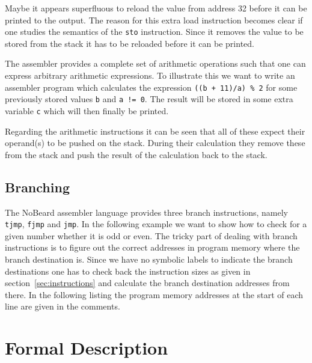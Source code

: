 \documentclass[11pt]{report}
\newcommand{\leongage}{NoBeard}
\begin{document}


Maybe it appears superfluous to reload the value from address 32 before it can be printed to the output. The reason for this extra load instruction becomes clear if one studies the semantics of the \lstinline$sto$ instruction. Since it removes the value to be stored from the stack it has to be reloaded before it can be printed.

The assembler provides a complete set of arithmetic operations such that one can express arbitrary arithmetic expressions. To illustrate this we want to write an assembler program which calculates the expression \lstinline$((b + 11)/a) % 2$
for some previously stored values \lstinline$b$ and \lstinline$a != 0$. The result will be stored in some extra variable \lstinline$c$ which will then finally be printed.



Regarding the arithmetic instructions it can be seen that all of these expect their operand(s) to be pushed on the stack. During their calculation they remove these from the stack and push the result of the calculation back to the stack.

\subsection{Branching}
The \leongage{} assembler language provides three branch instructions, namely \lstinline$tjmp$, \lstinline$fjmp$ and \lstinline$jmp$. In the following example we want to show how to check for a given number whether it is odd or even. The tricky part of dealing with branch instructions is to figure out the correct addresses in program memory where the branch destination is. Since we have no symbolic labels to indicate the branch destinations one has to check back the instruction sizes as given in section~\ref{sec:instructions} and calculate the branch destination addresses from there. In the following listing the program memory addresses at the start of each line are given in the comments.


\section{Formal Description}
\end{document}
